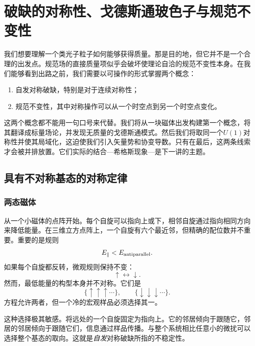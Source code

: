\chapter{破缺的对称性、戈德斯通玻色子与规范不变性}

我们想要理解一个类光子粒子如何能够获得质量。那是目的地，但它并不是一个合理的出发点。规范场的直接质量项似乎会破坏使理论自洽的规范不变性本身。在我们能够看到出路之前，我们需要以可操作的形式掌握两个概念：
\begin{enumerate}
  \item 自发对称破缺，特别是对于连续对称性；
  \item 规范不变性，其中对称操作可以从一个时空点到另一个时空点变化。
\end{enumerate}
这两个概念都不能用一句口号来代替。我们将从一块磁体出发构建第一个概念，将其翻译成标量场论，并发现无质量的戈德斯通模式。然后我们将取同一个\(U(1)\)对称性并使其局域化，这迫使我们引入矢量势和协变导数。只有在最后，这两条线索才会被并排放置。它们实际的结合---希格斯现象---是下一讲的主题。

\section{具有不对称基态的对称定律}

\subsection{两态磁体}

从一个小磁体的点阵开始。每个自旋可以指向上或下，相邻自旋通过指向相同方向来降低能量。在三维立方点阵上，一个自旋有六个最近邻，但精确的配位数并不重要。重要的是规则
\begin{equation}
  E_{\parallel}<E_{\rm antiparallel}.
\end{equation}
如果每个自旋都反转，微观规则保持不变：
\begin{equation}
  \uparrow\longleftrightarrow\downarrow.
\end{equation}
然而，最低能量的构型本身并不对称。它们是
\begin{equation}
  \{\uparrow\uparrow\uparrow\cdots\},
  \qquad
  \{\downarrow\downarrow\downarrow\cdots\}.
\end{equation}
方程允许两者，但一个冷的宏观样品必须选择其一。

这种选择极其敏感。将远处的一个自旋固定为指向上。它的邻居倾向于跟随它，邻居的邻居倾向于跟随它们，信息通过样品传播。与整个系统相比任意小的微扰可以选择整个基态的取向。这就是\emph{自发}对称破缺所指的不稳定性。

